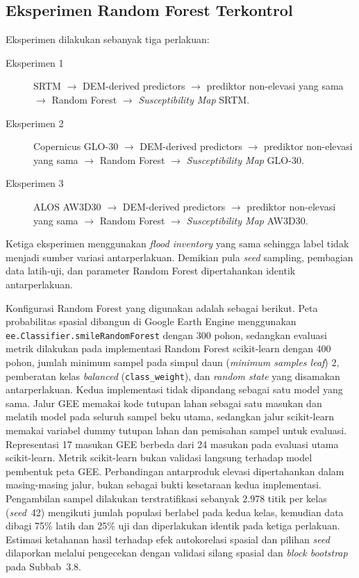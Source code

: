 \documentclass[12pt]{article}
\begin{document}
\subsection{Eksperimen Random Forest Terkontrol}

Eksperimen dilakukan sebanyak tiga perlakuan:

\begin{description}
\item[Eksperimen 1] SRTM $\rightarrow$ DEM-derived predictors $\rightarrow$
prediktor non-elevasi yang sama $\rightarrow$ Random Forest $\rightarrow$
\textit{Susceptibility Map} SRTM.
\item[Eksperimen 2] Copernicus GLO-30 $\rightarrow$ DEM-derived predictors
$\rightarrow$ prediktor non-elevasi yang sama $\rightarrow$ Random Forest
$\rightarrow$ \textit{Susceptibility Map} GLO-30.
\item[Eksperimen 3] ALOS AW3D30 $\rightarrow$ DEM-derived predictors
$\rightarrow$ prediktor non-elevasi yang sama $\rightarrow$ Random Forest
$\rightarrow$ \textit{Susceptibility Map} AW3D30.
\end{description}

Ketiga eksperimen menggunakan \textit{flood inventory} yang sama sehingga
label tidak menjadi sumber variasi antarperlakuan. Demikian pula \textit{seed}
sampling, pembagian data latih-uji, dan parameter Random Forest dipertahankan
identik antarperlakuan.

Konfigurasi Random Forest yang digunakan adalah sebagai berikut. Peta
probabilitas spasial dibangun di Google Earth Engine menggunakan
\texttt{ee.Classifier.smileRandomForest} dengan 300 pohon, sedangkan
evaluasi metrik dilakukan pada implementasi Random Forest scikit-learn
dengan 400 pohon, jumlah minimum sampel pada simpul daun
(\textit{minimum samples leaf}) 2,
pemberatan kelas \textit{balanced} (\texttt{class\_weight}), dan
\textit{random state} yang disamakan antarperlakuan. Kedua implementasi
tidak dipandang sebagai satu model yang sama. Jalur GEE memakai kode tutupan
lahan sebagai satu masukan dan melatih model pada seluruh
sampel beku utama, sedangkan jalur scikit-learn memakai variabel dummy
tutupan lahan dan pemisahan sampel untuk evaluasi. Representasi 17 masukan GEE berbeda dari 24 masukan pada evaluasi utama
scikit-learn. Metrik scikit-learn bukan validasi langsung terhadap
model pembentuk peta GEE. Perbandingan antarproduk elevasi dipertahankan
dalam masing-masing jalur, bukan sebagai bukti kesetaraan kedua implementasi.
Pengambilan sampel dilakukan terstratifikasi sebanyak 2.978 titik per kelas
(\textit{seed}~42) mengikuti jumlah populasi berlabel pada kedua kelas,
kemudian data dibagi 75\% latih dan 25\% uji dan diperlakukan identik pada
ketiga perlakuan. Estimasi ketahanan hasil terhadap efek autokorelasi
spasial dan pilihan \textit{seed} dilaporkan melalui pengecekan dengan
validasi silang spasial dan \textit{block bootstrap} pada Subbab~3.8.
\end{document}

